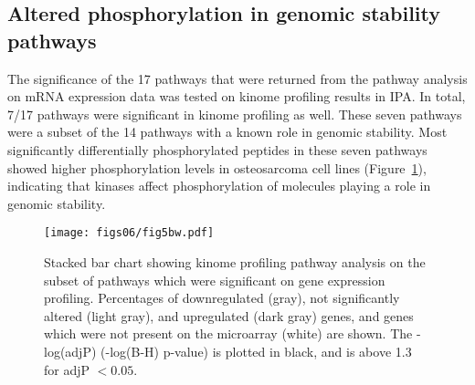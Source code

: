 \subsection{Altered phosphorylation in genomic stability pathways}
The significance of the 17 pathways that were returned from the pathway analysis on mRNA expression data was tested on kinome profiling results in IPA. In total, 7/17 pathways were significant in kinome profiling as well. These seven pathways were a subset of the 14 pathways with a known role in genomic stability. Most significantly differentially phosphorylated peptides in these seven pathways showed higher phosphorylation levels in osteosarcoma cell lines (Figure~\ref{fig6.5}), indicating that kinases affect phosphorylation of molecules playing a role in genomic stability.
%
\begin{figure}[htbp]
	\centering
	\texttt{[image: figs06/fig5bw.pdf]}	%
	\caption{Stacked bar chart showing kinome profiling pathway analysis on the subset of pathways which were significant on gene expression profiling. Percentages of downregulated (gray), not significantly altered (light gray), and upregulated (dark gray) genes, and genes which were not present on the microarray (white) are shown. The -log(adjP) (-log(B-H) p-value) is plotted in black, and is above 1.3 for adjP $<0.05$.} %
	\label{fig6.5}
\end{figure}
%

